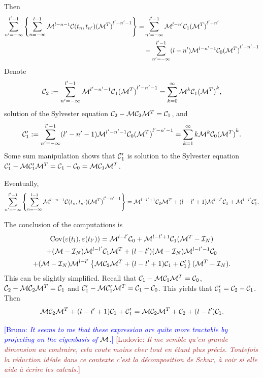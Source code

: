 \documentclass{article}
\newcommand{\B}[1]{{\textcolor{blue}{[Bruno: \textit{#1}]}}}
\renewcommand{\L}[1]{{\textcolor{Brown}{[Ludovic: \textit{#1}]}}}
\begin{document}
Then
\begin{equation}
\begin{aligned}
\sum_{n'=-\infty}^{l'-1}
    \left\{
        \sum_{n=-\infty}^{l-1}{{\mathcal M}}^{l-n-1}{\mathcal C}(t_n,t_{n'}){({\mathcal M}^T)}^{l'-n'-1}
    \right\} 
=&
\sum_{n'=-\infty}^{l'-1}{{\mathcal M}}^{l-n'}{\mathcal C}_1{({\mathcal M}^T)}^{l'-n'}
\\
&+
\sum_{n'=-\infty}^{l'-1}(l-n'){{\mathcal M}}^{l-n'-1}{\mathcal C}_0{({\mathcal M}^T)}^{l'-n'-1}
\end{aligned}
\end{equation}
Denote
$$
{\mathcal C}_{2}:=\sum_{n'=-\infty}^{l'-1}{\mathcal M}^{l'-n'-1}{\mathcal C}_1{({\mathcal M}^T)}^{l'-n'-1}=\sum_{k=0}^{\infty}{\mathcal M}^{k}{\mathcal C}_1{({\mathcal M}^T)}^{k},
$$
solution of the Sylvester equation ${\mathcal C}_2-{\mathcal M}{\mathcal C}_2{\mathcal M}^T={\mathcal C}_1$,
and 
$$
{\mathcal C}_{1}':=\sum_{n'=-\infty}^{l'-1}(l'-n'-1){{\mathcal M}}^{l'-n'-1}{\mathcal C}_0{({\mathcal M}^T)}^{l'-n'-1}=\sum_{k=1}^{\infty}k {\mathcal M}^{k}{\mathcal C}_0{({\mathcal M}^T)}^{k}.
$$
Some sum manipulation shows that ${\mathcal C}_1'$ is solution to the Sylvester equation 
${\mathcal C}_1'-{\mathcal M}{\mathcal C}_1'{\mathcal M}^T={\mathcal C}_1-{\mathcal C}_0={\mathcal M}{\mathcal C}_1{\mathcal M}^T$.

Eventually,
\begin{equation}\label{E:term4}
\sum_{n'=-\infty}^{l'-1}
    \left\{
        \sum_{n=-\infty}^{l-1}{{\mathcal M}}^{l-n-1}{\mathcal C}(t_n,t_{n'}){({\mathcal M}^T)}^{l'-n'-1}
    \right\} 
    ={\mathcal M}^{l-l'+1} {\mathcal C}_2 {\mathcal M}^T+(l-l'+1){\mathcal M}^{l-l'}{\mathcal C}_1+{\mathcal M}^{l-l'}{\mathcal C}_1'.
\end{equation}

The conclusion of the computations is
\begin{multline}
    \mathrm{Cov}(\varepsilon(t_l),\varepsilon(t_{l'}))
    =
    {\mathcal M}^{l-l'}{\mathcal C}_0+{\mathcal M}^{l-l'+1}{\mathcal C}_{1}({\mathcal M}^T-{\mathcal I}_N)
    \\
    +
    ({\mathcal M}-{\mathcal I}_N){\mathcal M}^{l-l'}{\mathcal C}_{1}{\mathcal M}^T+(l-l')({\mathcal M}-{\mathcal I}_N){\mathcal M}^{l-l'-1}{\mathcal C}_{0}
    \\
    +
    ({\mathcal M}-{\mathcal I}_N){\mathcal M}^{l-l'}
    \left\{
        {\mathcal M} {\mathcal C}_2 {\mathcal M}^T+(l-l'+1){\mathcal C}_1+{\mathcal C}_1'
    \right\}
    ({\mathcal M}^T-{\mathcal I}_N).
\end{multline}
This can be slightly simplified. Recall that ${\mathcal C}_1-{\mathcal M}{\mathcal C}_1{\mathcal M}^T={\mathcal C}_0$, ${\mathcal C}_2-{\mathcal M}{\mathcal C}_2{\mathcal M}^T={\mathcal C}_1$ and ${\mathcal C}_1'-{\mathcal M}{\mathcal C}_1'{\mathcal M}^T={\mathcal C}_1-{\mathcal C}_0$. This yields that ${\mathcal C}'_1={\mathcal C}_2-{\mathcal C}_1$. Then 
$$
{\mathcal M} {\mathcal C}_2 {\mathcal M}^T+(l-l'+1){\mathcal C}_1+{\mathcal C}_1'={\mathcal M} {\mathcal C}_2 {\mathcal M}^T+{\mathcal C}_2+(l-l'){\mathcal C}_1.
$$

\B{It seems to me that these expression are quite more tractable by projecting on the eigenbasis of ${\mathcal M}$.}
\L{Il me semble qu'en grande dimension au contraire, cela coute moins cher tout en étant plus précis. Toutefois la réduction idéale dans ce contexte c'est la décomposition de Schur, à voir si elle aide à écrire les calculs.}
\end{document}
